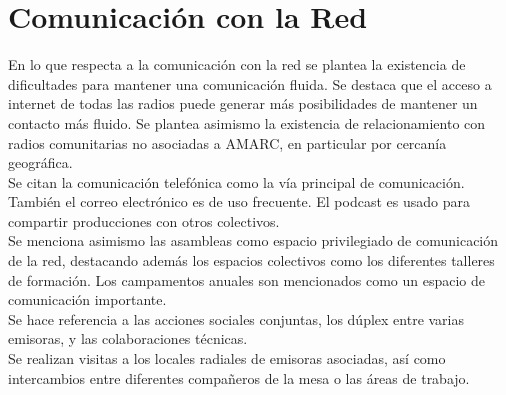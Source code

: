 \section{Comunicación con la Red}

En lo que respecta a la comunicación con la red se plantea la existencia de dificultades para mantener una comunicación fluida.  Se destaca que el acceso a internet de todas las radios puede generar más posibilidades de mantener un contacto más fluido. Se plantea asimismo la existencia de relacionamiento con radios comunitarias no asociadas a AMARC, en particular por cercanía geográfica.\\

Se citan la comunicación telefónica como la vía principal de comunicación. También el correo electrónico es de uso frecuente. El podcast es usado para compartir producciones con otros colectivos.\\

Se menciona asimismo las asambleas como espacio privilegiado de comunicación de la red, destacando además los espacios colectivos como los diferentes talleres de formación. Los campamentos anuales son mencionados como un espacio de comunicación importante.\\

Se hace referencia a las acciones sociales conjuntas, los dúplex entre varias emisoras, y las colaboraciones técnicas.\\

Se realizan visitas a los locales radiales de emisoras asociadas, así como intercambios entre diferentes compañeros de la mesa o las áreas de trabajo.